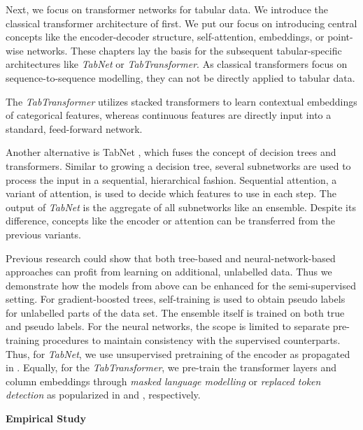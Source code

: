 Next, we focus on transformer networks for tabular data. We introduce the classical transformer architecture of \autocite{vaswaniAttentionAllYou2017} first. We put our focus on introducing central concepts like the encoder-decoder structure, self-attention, embeddings, or point-wise networks. These chapters lay the basis for the subsequent tabular-specific architectures like \textit{TabNet} or \textit{TabTransformer}. As classical transformers focus on sequence-to-sequence modelling, they can not be directly applied to tabular data.

The \textit{TabTransformer} \autocite{huangTabTransformerTabularData2020} utilizes stacked transformers to learn contextual embeddings of categorical features, whereas continuous features are directly input into a standard, feed-forward network.

Another alternative is TabNet \autocite{arikTabNetAttentiveInterpretable2020}, which fuses the concept of decision trees and transformers. Similar to growing a decision tree, several subnetworks are used to process the input in a sequential, hierarchical fashion. Sequential attention, a variant of attention, is used to decide which features to use in each step. The output of \textit{TabNet} is the aggregate of all subnetworks like an ensemble. Despite its difference, concepts like the encoder or attention can be transferred from the previous variants. 

Previous research \autocite{arikTabNetAttentiveInterpretable2020} could show that both tree-based and neural-network-based approaches can profit from learning on additional, unlabelled data. Thus we demonstrate how the models from above can be enhanced for the semi-supervised setting. For gradient-boosted trees, self-training \autocite{yarowskyUnsupervisedWordSense1995} is used to obtain pseudo labels for unlabelled parts of the data set. The ensemble itself is trained on both true and pseudo labels. For the neural networks, the scope is limited to separate pre-training procedures to maintain consistency with the supervised counterparts. Thus, for \textit{TabNet}, we use unsupervised pretraining of the encoder as propagated in \textcite{arikTabNetAttentiveInterpretable2020}. Equally, for the \textit{TabTransformer}, we pre-train the transformer layers and column embeddings through \textit{masked language modelling} or \textit{replaced token detection} as popularized in \textcite{devlinBERTPretrainingDeep2019} and \textcite{clarkELECTRAPretrainingText2020}, respectively. 

\textbf{Empirical Study}

